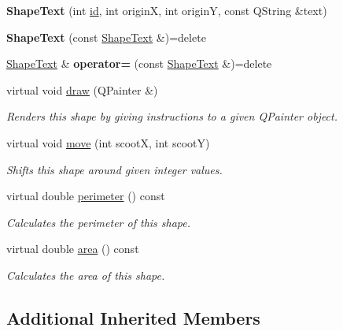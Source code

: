 \begin{DoxyCompactItemize}
\item 
\mbox{\label{class_shape_text_a4597efa4aa9d2d80e6fd4759432a5443}} 
{\bfseries Shape\+Text} (int \mbox{\hyperlink{class_i_shape_a6ff2d631831c1079b88eeebc8ac65bb0}{id}}, int originX, int originY, const Q\+String \&text)
\item 
\mbox{\label{class_shape_text_a7a0ed54eebed7e3e0b0a8c7139a22aa7}} 
{\bfseries Shape\+Text} (const \mbox{\hyperlink{class_shape_text}{Shape\+Text}} \&)=delete
\item 
\mbox{\label{class_shape_text_a420d8e795e693a4e9f087786152f931a}} 
\mbox{\hyperlink{class_shape_text}{Shape\+Text}} \& {\bfseries operator=} (const \mbox{\hyperlink{class_shape_text}{Shape\+Text}} \&)=delete
\item 
virtual void \mbox{\hyperlink{class_shape_text_a554bed75c86d0ca7d555eefbc7aff7dc}{draw}} (Q\+Painter \&)
\begin{DoxyCompactList}\small\item\em Renders this shape by giving instructions to a given Q\+Painter object. \end{DoxyCompactList}\item 
virtual void \mbox{\hyperlink{class_shape_text_ae7b73f317077c9873f4bd59c98b89c60}{move}} (int scootX, int scootY)
\begin{DoxyCompactList}\small\item\em Shifts this shape around given integer values. \end{DoxyCompactList}\item 
virtual double \mbox{\hyperlink{class_shape_text_a01a24fe247554c614f98756f964ca0f8}{perimeter}} () const
\begin{DoxyCompactList}\small\item\em Calculates the perimeter of this shape. \end{DoxyCompactList}\item 
virtual double \mbox{\hyperlink{class_shape_text_ae7af61e4159b53963fa6342024baca70}{area}} () const
\begin{DoxyCompactList}\small\item\em Calculates the area of this shape. \end{DoxyCompactList}\end{DoxyCompactItemize}
\subsection*{Additional Inherited Members}


